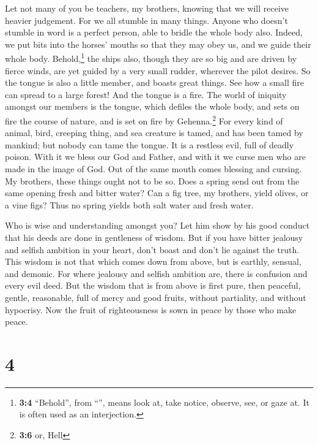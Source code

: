  Let not many of you be teachers, my brothers, knowing
that we will receive heavier judgement.  For we all
stumble in many things. Anyone who doesn't stumble in word is a perfect
person, able to bridle the whole body also.  Indeed, we
put bits into the horses' mouths so that they may obey us, and we guide
their whole body.  Behold,\footnote{\textbf{3:4}
  ``Behold'', from ``'', means look at, take notice,
  observe, see, or gaze at. It is often used as an interjection.} the
ships also, though they are so big and are driven by fierce winds, are
yet guided by a very small rudder, wherever the pilot desires.
 So the tongue is also a little member, and boasts great
things. See how a small fire can spread to a large forest!
 And the tongue is a fire. The world of iniquity amongst
our members is the tongue, which defiles the whole body, and sets on
fire the course of nature, and is set on fire by Gehenna.\footnote{\textbf{3:6}
  or, Hell}  For every kind of animal, bird, creeping
thing, and sea creature is tamed, and has been tamed by mankind;
 but nobody can tame the tongue. It is a restless evil,
full of deadly poison.  With it we bless our God and
Father, and with it we curse men who are made in the image of God.
 Out of the same mouth comes blessing and cursing. My
brothers, these things ought not to be so.  Does a spring
send out from the same opening fresh and bitter water? 
Can a fig tree, my brothers, yield olives, or a vine figs? Thus no
spring yields both salt water and fresh water.

 Who is wise and understanding amongst you? Let him show
by his good conduct that his deeds are done in gentleness of wisdom.
 But if you have bitter jealousy and selfish ambition in
your heart, don't boast and don't lie against the truth. 
This wisdom is not that which comes down from above, but is earthly,
sensual, and demonic.  For where jealousy and selfish
ambition are, there is confusion and every evil deed. 
But the wisdom that is from above is first pure, then peaceful, gentle,
reasonable, full of mercy and good fruits, without partiality, and
without hypocrisy.  Now the fruit of righteousness is
sown in peace by those who make peace.

\hypertarget{section-3}{%
\section{4}\label{section-3}}

